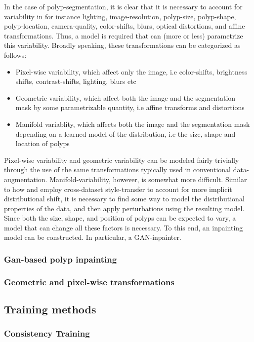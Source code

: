   		In the case of polyp-segmentation, it is clear that it is necessary to account for variability in for instance lighting, image-resolution, polyp-size, polyp-shape, polyp-location, camera-quality, color-shifts, blurs, optical distortions, and affine transformations. Thus, a model is required that can (more or less) parametrize this variability. Broadly speaking, these transformations can be categorized as follows:
  		\begin{itemize}
  			\item Pixel-wise variability, which affect only the image, i.e color-shifts, brightness shifts, contrast-shifts, lighting, blurs etc
  			\item Geometric variability, which affect both the image and the segmentation mask by some parametrizable quantity, i.e affine transforms and distortions
  			\item Manifold variablity, which affects both the image and the segmentation mask depending on a learned model of the distribution,  i.e the size, shape and location of polyps
  		\end{itemize}
  		Pixel-wise variability and geometric variability can be modeled fairly trivially through the use of the same transformations typically used in conventional data-augmentation. Manifold-variability, however, is somewhat more difficult. Similar to how \cite{modelbased} and \cite{cyclegan} employ cross-dataset style-transfer to account for more implicit distributional shift, it is necessary to find some way to model the distributional properties of the data, and then apply perturbations using the resulting model. Since both the size, shape, and position of polyps can be expected to vary, a model that can change all these factors is necessary. To this end, an inpainting model can be constructed. In particular, a GAN-inpainter. 
  		\subsubsection{Gan-based polyp inpainting}
  		\subsubsection{Geometric and pixel-wise transformations}
  	\subsection{Training methods}
		\subsubsection{Consistency Training}
